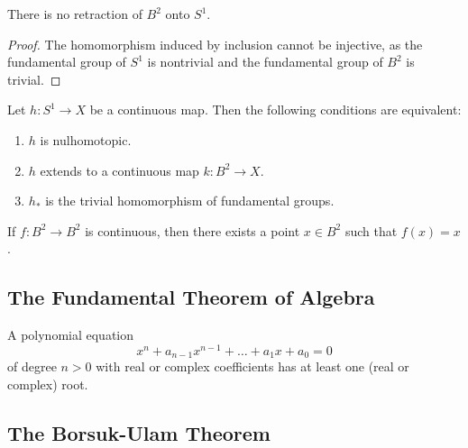 \begin{theorem}
There is no retraction of $B^2$ onto $S^1$.
\end{theorem}

\begin{proof}
The homomorphism induced by inclusion cannot be injective, as the fundamental group of $S^1$ is nontrivial and the fundamental group of $B^2$ is trivial.
\end{proof}

\begin{lemma}
Let $h\colon S^1 \rightarrow X$ be a continuous map. Then the following conditions are equivalent:
\begin{enumerate}[1)]
    \item $h$ is nulhomotopic.
    \item $h$ extends to a continuous map $k\colon B^2 \rightarrow X$.
    \item $h_{\ast}$ is the trivial homomorphism of fundamental groups.
\end{enumerate}
\end{lemma}

\begin{theorem}
If $f\colon B^2 \rightarrow B^2$ is continuous, then there exists a point $x \in B^2$ such that $f(x) = x$.
\end{theorem}


\subsection{The Fundamental Theorem of Algebra}
\begin{theorem}
A polynomial equation
\[
    x^n + a_{n-1}x^{n-1} + \dots + a_1 x + a_0 = 0
\]
of degree $n > 0$ with real or complex coefficients has at least one (real or complex) root.
\end{theorem}

\subsection{The Borsuk-Ulam Theorem}

